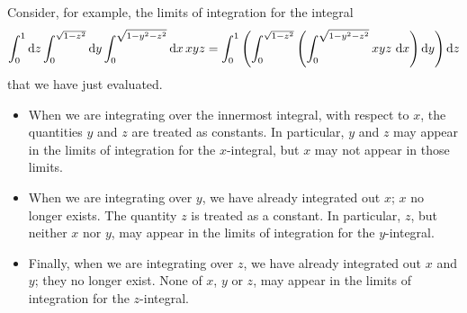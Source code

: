 Consider, for example, the limits of integration for the integral
\begin{align*}
\int_0^1\dee{z}\int_0^{\sqrt{1-z^2}}\dee{y}\int_0^{\sqrt{1-y^2-z^2}}  \dee{x}\,xyz
=\int_0^1\left(\int_0^{\sqrt{1-z^2}}\left(\int_0^{\sqrt{1-y^2-z^2}}  xyz\ \dee{x}\right)\dee{y} \right)\dee{z}
\end{align*}
that we have just evaluated.
\begin{itemize}
\item
When we are integrating over the innermost integral, with respect to $x$,
the quantities $y$ and $z$ are treated as constants. In particular,
$y$ and $z$ may appear in the limits of integration for the $x$-integral,
but $x$ may not appear in those limits.
\item
When we are integrating over $y$, we have already integrated out $x$;
$x$ no longer exists. The quantity $z$ is treated as a constant. In particular,
$z$, but neither $x$ nor $y$, may appear in the limits of integration for the $y$-integral.
\item
Finally, when we are integrating over $z$, we have already integrated out 
$x$ and $y$; they no longer exist. None of $x$, $y$ or $z$, may appear in the limits of integration for the $z$-integral.

\end{itemize}

